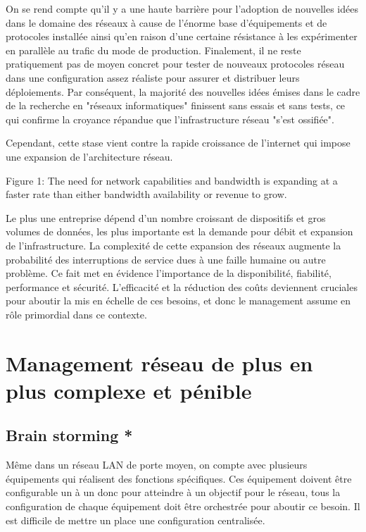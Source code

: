 \par
On se rend compte qu'il y a une haute barrière pour l'adoption de nouvelles idées dans le domaine des réseaux à cause de l'énorme base d'équipements et de protocoles installée ainsi qu'en raison d'une certaine résistance à les expérimenter en parallèle au trafic du mode de production. Finalement, il ne reste pratiquement pas de moyen concret pour tester de nouveaux protocoles réseau dans une configuration assez réaliste pour assurer et distribuer leurs déploiements. Par conséquent, la majorité des nouvelles idées émises dans le cadre de la recherche en "réseaux informatiques" finissent sans essais et sans tests, ce qui confirme la croyance répandue que l'infrastructure réseau "s'est ossifiée". \cite{OpenFlowStanford} 

Cependant, cette stase vient contre la rapide croissance de l'internet qui impose une expansion de l'architecture réseau. 

Figure 1: The need for network capabilities and bandwidth is expanding at a faster rate than either bandwidth availability or revenue to grow.

Le plus une entreprise dépend d'un nombre croissant de dispositifs et gros volumes de données, les plus importante est la demande pour débit et expansion de l'infrastructure. La complexité de cette expansion des réseaux augmente la probabilité des interruptions de service dues à une faille humaine ou autre problème. Ce fait met en évidence l'importance de la disponibilité, fiabilité, performance et sécurité. L'efficacité et la réduction des coûts deviennent cruciales pour aboutir la mis en échelle de ces besoins, et donc le management assume en rôle primordial dans ce contexte.
 

\section{Management réseau de plus en plus complexe et pénible }

\subsection*{Brain storming *}

Même dans un réseau LAN de porte moyen,  on compte avec plusieurs équipements qui réalisent des fonctions spécifiques. Ces équipement doivent être configurable un à un donc pour atteindre à un objectif pour le réseau, tous la configuration de chaque équipement doit être orchestrée pour aboutir ce besoin. Il est difficile de mettre un place une configuration centralisée.

